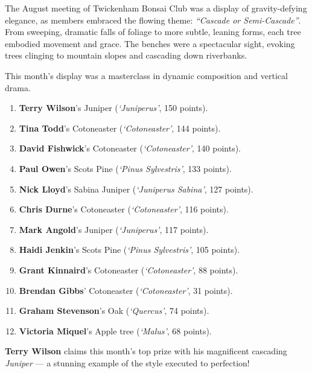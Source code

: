 \label{2025-08-contest}
\noindent
The August meeting of Twickenham Bonsai Club was a display of gravity\--defying elegance, as members embraced the flowing theme: \textit{``Cascade or Semi\--Cascade''}.
From sweeping, dramatic falls of foliage to more subtle, leaning forms, each tree embodied movement and grace.
The benches were a spectacular sight, evoking trees clinging to mountain slopes and cascading down riverbanks.

\noindent 
This month's display was a masterclass in dynamic composition and vertical drama.

\begin{enumerate}
    \item \textbf{Terry Wilson}'s Juniper (\textit{`Juniperus'}, 150 points).
    \item \textbf{Tina Todd}'s Cotoneaster (\textit{`Cotoneaster'}, 144 points).
    \item \textbf{David Fishwick}'s Cotoneaster (\textit{`Cotoneaster'}, 140 points).
    \item \textbf{Paul Owen}'s Scots Pine (\textit{`Pinus Sylvestris'}, 133 points).
    \item \textbf{Nick Lloyd}'s Sabina Juniper (\textit{`Juniperus Sabina'}, 127 points).
    \item \textbf{Chris Durne}'s Cotoneaster (\textit{`Cotoneaster'}, 116 points).
    \item \textbf{Mark Angold}'s Juniper (\textit{`Juniperus'}, 117 points).
    \item \textbf{Haidi Jenkin}'s Scots Pine (\textit{`Pinus Sylvestris'}, 105 points).
    \item \textbf{Grant Kinnaird}'s Cotoneaster (\textit{`Cotoneaster'}, 88 points).
    \item \textbf{Brendan Gibbs}' Cotoneaster (\textit{`Cotoneaster'}, 31 points).
    \item \textbf{Graham Stevenson}'s Oak (\textit{`Quercus'}, 74 points).
    \item \textbf{Victoria Miquel}'s Apple tree (\textit{`Malus'}, 68 points).
\end{enumerate}

\noindent 
\textbf{Terry Wilson} claims this month's top prize with his magnificent cascading \textit{Juniper} --- a stunning example of the style executed to perfection!

